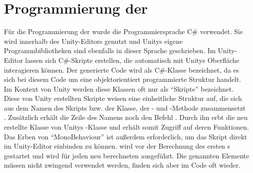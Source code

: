 \chapter{Programmierung der \mapp}
\label{ch:coding}
Für die Programmierung der \mapp wurde die Programmiersprache C\# verwendet. Sie wird innerhalb des Unity-Editors genutzt und Unitys eigene Programmbibliotheken sind ebenfalls in dieser Sprache geschrieben. Im Unity-Editor lassen sich C\#-Skripte erstellen, die automatisch mit Unitys Oberfläche interagieren können. Der generierte Code wird als C\#-Klasse bezeichnet, da es sich bei diesem Code um eine objektorientiert programmierte Struktur handelt. Im Kontext von Unity werden diese Klassen oft nur als \enquote{Skripte} bezeichnet. Diese von Unity erstellten Skripte weisen eine einheitliche Struktur auf, die sich aus dem Namen des Skripts bzw. der Klasse, der - und -Methode zusammensetzt . Zusätzlich erhält die Zeile des Namens noch den Befehl . Durch ihn erbt die neu erstellte Klasse von Unitys -Klasse und erhält somit Zugriff auf deren Funktionen. Das Erben von \enquote{MonoBehaviour} ist außerdem erforderlich, um das Skript direkt im Unity-Editor einbinden zu können.  wird vor der Berechnung des ersten s gestartet und  wird für jeden neu berechneten  ausgeführt. Die genannten Elemente müssen nicht zwingend verwendet werden, finden sich aber im Code oft wieder.
%
